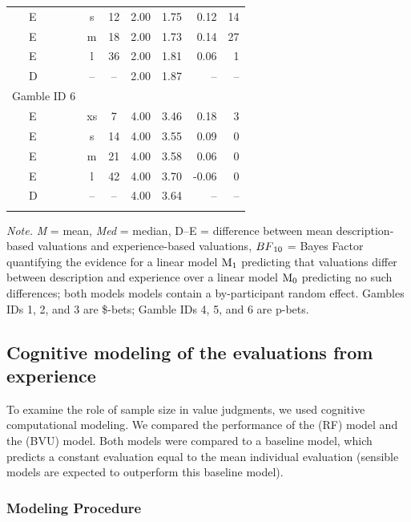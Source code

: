 \documentclass[a4paper, man, floatsintext]{apa6}
\begin{document}
\begin{table}[tbp]
\begin{center}
\begin{threeparttable}
\begin{tabular}{lccccrr}
\ \ \ E & s & 12 & 2.00 & 1.75 & 0.12 & 14\\
\ \ \ E & m & 18 & 2.00 & 1.73 & 0.14 & 27\\
\ \ \ E & l & 36 & 2.00 & 1.81 & 0.06 & 1\\
\ \ \ D & -- & -- & 2.00 & 1.87 & -- & --\\
Gamble ID 6 &  &  &  &  &  & \\
\ \ \ E & xs & 7 & 4.00 & 3.46 & 0.18 & 3\\
\ \ \ E & s & 14 & 4.00 & 3.55 & 0.09 & 0\\
\ \ \ E & m & 21 & 4.00 & 3.58 & 0.06 & 0\\
\ \ \ E & l & 42 & 4.00 & 3.70 & -0.06 & 0\\
\ \ \ D & -- & -- & 4.00 & 3.64 & -- & --\\
\bottomrule
\addlinespace
\end{tabular}
\begin{tablenotes}[para]
\normalsize{\textit{Note.} \textit{M} = mean, \textit{Med} = median, D--E = difference between mean description-based valuations and experience-based valuations, $BF\textsubscript{10}$ = Bayes Factor quantifying the evidence for a linear model $\mathrm{M}\textsubscript{1}$ predicting that valuations differ between description and experience over a linear model $\mathrm{M}\textsubscript{0}$ predicting no such differences; both models models contain a by-participant random effect. Gambles IDs 1, 2, and 3 are \$-bets; Gamble IDs 4, 5, and 6 are p-bets.}
\end{tablenotes}
\end{threeparttable}
\end{center}
\end{table}

\subsection{Cognitive modeling of the evaluations from experience}
To examine the role of sample size in value judgments, we
used cognitive computational modeling. We compared the performance of
the  (RF) model and the
 (BVU) model. Both models were compared to a baseline model, which predicts a constant evaluation equal to the mean individual evaluation (sensible models are expected to outperform this baseline model).

\subsubsection{Modeling Procedure}
\end{document}
